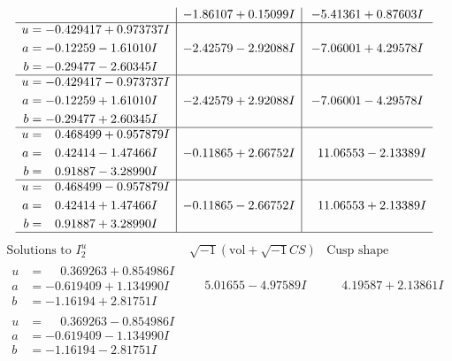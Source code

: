 \documentclass[1p]{elsarticle_modified}
\theoremstyle{definition}
\newcommand{\I}{\sqrt{-1}}
\begin{document}
$$\begin{array}{c|c|c}
 & -1.86107 + 0.15099 I & -5.41361 + 0.87603 I \\ \hline\begin{aligned}
u &= -0.429417 + 0.973737 I \\
a &= -0.12259 - 1.61010 I \\
b &= -0.29477 - 2.60345 I\end{aligned}
 & -2.42579 - 2.92088 I & -7.06001 + 4.29578 I \\ \hline\begin{aligned}
u &= -0.429417 - 0.973737 I \\
a &= -0.12259 + 1.61010 I \\
b &= -0.29477 + 2.60345 I\end{aligned}
 & -2.42579 + 2.92088 I & -7.06001 - 4.29578 I \\ \hline\begin{aligned}
u &= \phantom{-}0.468499 + 0.957879 I \\
a &= \phantom{-}0.42414 - 1.47466 I \\
b &= \phantom{-}0.91887 - 3.28990 I\end{aligned}
 & -0.11865 + 2.66752 I & \phantom{-}11.06553 - 2.13389 I \\ \hline\begin{aligned}
u &= \phantom{-}0.468499 - 0.957879 I \\
a &= \phantom{-}0.42414 + 1.47466 I \\
b &= \phantom{-}0.91887 + 3.28990 I\end{aligned}
 & -0.11865 - 2.66752 I & \phantom{-}11.06553 + 2.13389 I\\
 \hline 
 \end{array}$$\newpage$$\begin{array}{c|c|c}  
\text{Solutions to }I^u_{2}& \I (\text{vol} + \sqrt{-1}CS) & \text{Cusp shape}\\
 \hline 
\begin{aligned}
u &= \phantom{-}0.369263 + 0.854986 I \\
a &= -0.619409 + 1.134990 I \\
b &= -1.16194 + 2.81751 I\end{aligned}
 & \phantom{-}5.01655 - 4.97589 I & \phantom{-}4.19587 + 2.13861 I \\ \hline\begin{aligned}
u &= \phantom{-}0.369263 - 0.854986 I \\
a &= -0.619409 - 1.134990 I \\
b &= -1.16194 - 2.81751 I\end{aligned}

\end{array}$$
\end{document}

